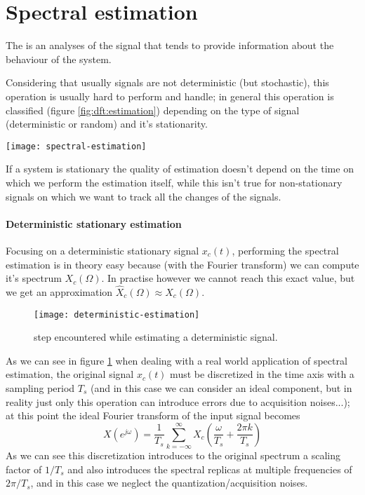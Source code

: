 \section{Spectral estimation}
	The  is an analyses of the signal that tends to provide information about the behaviour of the system.
	
	Considering that usually signals are not deterministic (but stochastic), this operation is usually hard to perform and handle; in general this operation is classified (figure \ref{fig:dft:estimation}) depending on the type of signal (deterministic or random) and it's stationarity.
	
	\begin{SCfigure}[1][bht]
		\centering \texttt{[image: spectral-estimation]}		
		\caption{classification of the spectral estimation} \label{fig:dft:estimation}
	\end{SCfigure}
	
	If a system is stationary the quality of estimation doesn't depend on the time on which we perform the estimation itself, while this isn't true for non-stationary signals on which we want to track all the changes of the signals.
	
	\paragraph{Deterministic stationary estimation} Focusing on a deterministic stationary signal $x_c(t)$, performing the spectral estimation is in theory easy because (with the Fourier transform) we can compute it's spectrum $X_c(\Omega)$. In practise however we cannot reach this exact value, but we get an approximation $\hat X_c(\Omega) \approx X_c(\Omega)$.
	
	\begin{figure}[bht]
		\centering
		\texttt{[image: deterministic-estimation]}
		\caption{step encountered while estimating a deterministic signal.}
		\label{fig:dft:deterministicestim}
	\end{figure}
	
	As we can see in figure \ref{fig:dft:deterministicestim} when dealing with a real world application of spectral estimation, the original signal $x_c(t)$ must be discretized in the time axis with a sampling period $T_s$ (and in this case we can consider an ideal component, but in reality just only this operation can introduce errors due to acquisition noises...); at this point the ideal Fourier transform of the input signal becomes
	\[ X(e^{j\omega}) = \frac 1{T_s} \sum_{k=-\infty}^{\infty} X_c \left( \frac \omega {T_s}+ \frac{2\pi k}{T_s} \right)  \]
	As we can see this discretization introduces to the original spectrum a scaling factor of $1/T_s$ and also introduces the spectral replicas at multiple frequencies of $2\pi/T_s$, and in  this case we neglect the quantization/acquisition noises.
	
